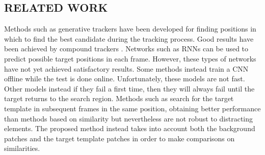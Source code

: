 \subsection{RELATED WORK}
Methods such as generative trackers have been developed for finding positions 
in which to find the best candidate during the tracking process. Good 
results have been achieved by compound trackers \cite{0893551105} \cite{0893551118}. Networks such as 
RNNs \cite{0893551121} can be used to predict possible target positions in each frame. 
However, these types of networks have not yet achieved satisfactory results. 
Some methods instead train a CNN offline while the test is done online. Unfortunately, 
these models are not fast. Other models instead if they fail a first 
time, then they will always fail until the target returns to the search region. 
Methods such as \cite{0893551129} \cite{0893551134} search for the target template in subsequent frames 
in the same position, obtaining better performance than methods based on 
similarity but nevertheless are not robust to distracting elements. The proposed 
method instead takes into account both the background patches and 
the target template patches in order to make comparisons on similarities.
